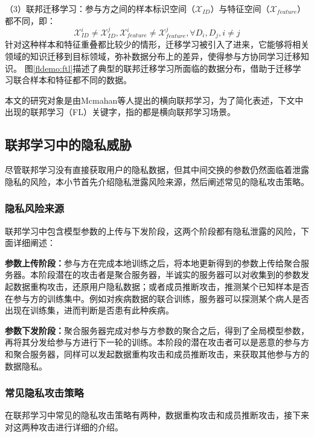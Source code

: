 （3）联邦迁移学习：参与方之间的样本标识空间（$\mathcal{X}_{ID}$）与特征空间（$\mathcal{X}_{feature}$）都不同，即：
\begin{equation}
	\mathcal{X}_{ID}^i \neq \mathcal{X}_{ID}^j, \mathcal{X}_{feature}^i \neq \mathcal{X}_{feature}^j , \forall {D}_i, {D}_j, i \neq j
\end{equation}
针对这种样本和特征重叠都比较少的情形，迁移学习被引入了进来，它能够将相关领域的知识迁移到目标领域，弥补数据分布上的差异，使得参与方协同学习迁移知识。
图\ref{fldemo:ftl}描述了典型的联邦迁移学习所面临的数据分布，借助于迁移学习联合样本和特征都不同的数据。

本文的研究对象是由Mcmahan等人\cite{mcmahan2017communication}提出的横向联邦学习，为了简化表述，下文中出现的联邦学习（FL）关键字，指的都是横向联邦学习场景。

\subsection{联邦学习中的隐私威胁}
尽管联邦学习没有直接获取用户的隐私数据，但其中间交换的参数仍然面临着泄露隐私的风险，本小节首先介绍隐私泄露风险来源，然后阐述常见的隐私攻击策略。

\subsubsection{隐私风险来源}
联邦学习中包含模型参数的上传与下发阶段，这两个阶段都有隐私泄露的风险，下面详细阐述：
\begin{compactitem}
	\item \textbf{参数上传阶段：}参与方在完成本地训练之后，将本地更新得到的参数上传给聚合服务器。本阶段潜在的攻击者是聚合服务器，半诚实的服务器可以对收集到的参数发起数据重构攻击，还原用户隐私数据；或者成员推断攻击，推测某个已知样本是否在参与方的训练集中。例如对疾病数据的联合训练，服务器可以探测某个病人是否出现在训练集，进而判断是否患有此种疾病。
	\item \textbf{参数下发阶段：}聚合服务器完成对参与方参数的聚合之后，得到了全局模型参数，再将其分发给参与方进行下一轮的训练。本阶段的潜在攻击者可以是恶意的参与方和聚合服务器，同样可以发起数据重构攻击和成员推断攻击，来获取其他参与方的数据隐私。
\end{compactitem}

\subsubsection{常见隐私攻击策略}
在联邦学习中常见的隐私攻击策略有两种，数据重构攻击和成员推断攻击，接下来对这两种攻击进行详细的介绍。

